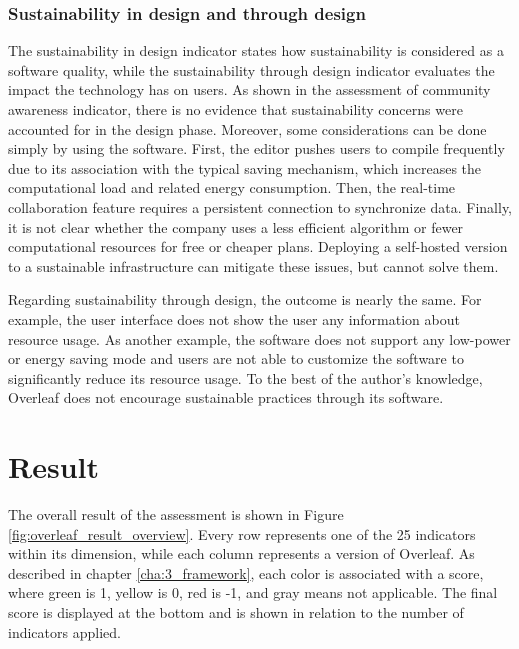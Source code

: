 \subsubsection{Sustainability in design and through design}
The sustainability in design indicator states how sustainability is considered as a software quality, while the sustainability through design indicator evaluates the impact the technology has on users. As shown in the assessment of community awareness indicator, there is no evidence that sustainability concerns were accounted for in the design phase. Moreover, some considerations can be done simply by using the software. First, the editor pushes users to compile frequently due to its association with the typical saving mechanism, which increases the computational load and related energy consumption. Then, the real-time collaboration feature requires a persistent connection to synchronize data. Finally, it is not clear whether the company uses a less efficient algorithm or fewer computational resources for free or cheaper plans. Deploying a self-hosted version to a sustainable infrastructure can mitigate these issues, but cannot solve them.

Regarding sustainability through design, the outcome is nearly the same. For example, the user interface does not show the user any information about resource usage. As another example, the software does not support any low-power or energy saving mode and users are not able to customize the software to significantly reduce its resource usage. To the best of the author's knowledge, Overleaf does not encourage sustainable practices through its software.

\section{Result}
\label{sec:4.3_overleaf_result}
The overall result of the assessment is shown in Figure \ref{fig:overleaf_result_overview}. Every row represents one of the 25 indicators within its dimension, while each column represents a version of Overleaf. As described in chapter \ref{cha:3_framework}, each color is associated with a score, where green is 1, yellow is 0, red is -1, and gray means not applicable. The final score is displayed at the bottom and is shown in relation to the number of indicators applied. 

